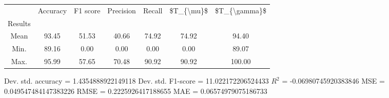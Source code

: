 \begin{tabular}{|c|c|c|c|c|c|c|}
\toprule
{} &  Accuracy &  F1 score &  Precision &  Recall &  \$T\_\{\textbackslash mu\}\$ &  \$T\_\{\textbackslash gamma\}\$ \\
Results &           &           &            &         &            &               \\
\hline
Mean    &     93.45 &     51.53 &      40.66 &   74.92 &      74.92 &         94.40 \\
Min.    &     89.16 &      0.00 &       0.00 &    0.00 &       0.00 &         89.07 \\
Max.    &     95.99 &     57.65 &      70.48 &   90.92 &      90.92 &        100.00 \\
\bottomrule
\end{tabular}

 Dev. std. accuracy = 1.4354888922149118
 Dev. std. F1-score = 11.022172206524433
 $R^2$ = -0.06980745920383846
 MSE = 0.049547484147383226
 RMSE = 0.2225926417188655
 MAE = 0.06574979075186733